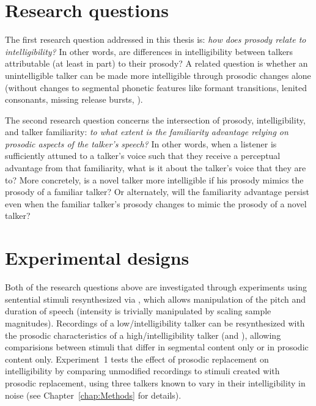 \section{Research questions}
The first research question addressed in this thesis is: {\em how does prosody relate to intelligibility?}  In other words, are differences in intelligibility between talkers attributable (at least in part) to their prosody?  A related question is whether an unintelligible talker can be made more intelligible through prosodic changes alone (without changes to segmental phonetic features like formant transitions, lenited consonants, missing release bursts, \etc).


The second research question concerns the intersection of prosody, intelligibility, and talker familiarity: {\em to what extent is the familiarity advantage relying on prosodic aspects of the talker’s speech?}  In other words, when a  listener is sufficiently attuned to a talker’s voice such that they receive a perceptual advantage from that familiarity, what is it about the talker’s voice that they are  to?  More concretely, is a novel talker more intelligible if his prosody mimics the prosody of a familiar talker?  Or alternately, will the familiarity advantage persist even when the familiar talker’s prosody changes to mimic the prosody of a novel talker?

\section{Experimental designs\label{sec:ExpDesign}}
Both of the research questions above are investigated through experiments using sentential stimuli resynthesized via \psola{} \citep{MoulinesCharpentier1990}, which allows manipulation of the pitch and duration of speech (intensity is trivially manipulated by scaling sample magnitudes).  Recordings of a low\-/intelligibility talker can be resynthesized with the prosodic characteristics of a high\-/intelligibility talker (and \vv), allowing comparisions between stimuli that differ in segmental content only or in prosodic content only.  Experiment~1 tests the effect of prosodic replacement on intelligibility by comparing unmodified recordings to stimuli created with prosodic replacement, using three talkers known to vary in their intelligibility in noise (see Chapter~\ref{chap:Methods} for details).

